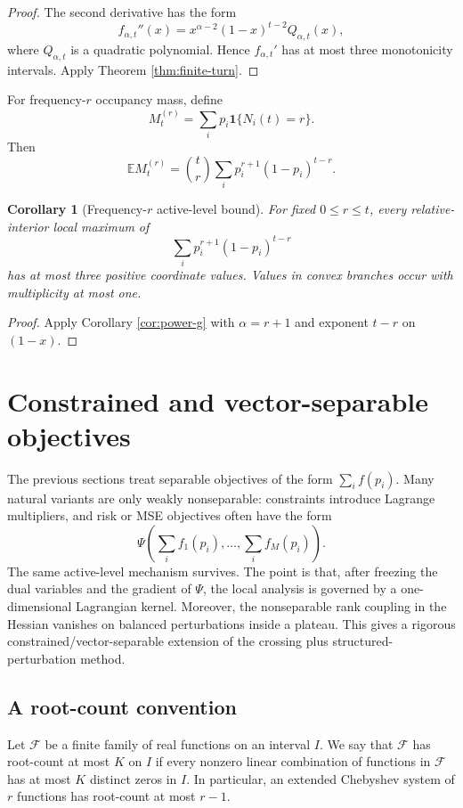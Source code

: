 \documentclass[11pt]{article}
\newtheorem{corollary}[theorem]{Corollary}
\theoremstyle{definition}
\newcommand{\E}{\mathbb E}
\newcommand{\ones}{\mathbf 1}
\begin{document}
\begin{proof}
The second derivative has the form
\[
  f_{\alpha,t}''(x)=x^{\alpha-2}(1-x)^{t-2}Q_{\alpha,t}(x),
\]
where $Q_{\alpha,t}$ is a quadratic polynomial. Hence $f_{\alpha,t}'$ has at most three monotonicity intervals. Apply Theorem \ref{thm:finite-turn}.
\end{proof}

For frequency-$r$ occupancy mass, define
\[
  M_t^{(r)}=\sum_i p_i\ones\{N_i(t)=r\}.
\]
Then
\[
  \E M_t^{(r)}=\binom{t}{r}\sum_i p_i^{r+1}(1-p_i)^{t-r}.
\]

\begin{corollary}[Frequency-$r$ active-level bound]\label{cor:frequency-r}
For fixed $0\le r\le t$, every relative-interior local maximum of
\[
  \sum_i p_i^{r+1}(1-p_i)^{t-r}
\]
has at most three positive coordinate values. Values in convex branches occur with multiplicity at most one.
\end{corollary}

\begin{proof}
Apply Corollary \ref{cor:power-g} with $\alpha=r+1$ and exponent $t-r$ on $(1-x)$.
\end{proof}


\section{Constrained and vector-separable objectives}\label{sec:vector-separable}

The previous sections treat separable objectives of the form $\sum_i f(p_i)$.  Many natural variants are only weakly nonseparable: constraints introduce Lagrange multipliers, and risk or MSE objectives often have the form
\[
  \Psi\left(\sum_i f_1(p_i),\ldots,\sum_i f_M(p_i)\right).
\]
The same active-level mechanism survives.  The point is that, after freezing the dual variables and the gradient of $\Psi$, the local analysis is governed by a one-dimensional Lagrangian kernel.  Moreover, the nonseparable rank coupling in the Hessian vanishes on balanced perturbations inside a plateau.  This gives a rigorous constrained/vector-separable extension of the crossing plus structured-perturbation method.

\subsection{A root-count convention}

Let $\mathcal F$ be a finite family of real functions on an interval $I$.  We say that $\mathcal F$ has root-count at most $K$ on $I$ if every nonzero linear combination of functions in $\mathcal F$ has at most $K$ distinct zeros in $I$.  In particular, an extended Chebyshev system of $r$ functions has root-count at most $r-1$.
\end{document}
